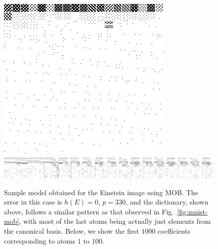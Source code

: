 \documentclass[twocolumn]{IEEEtran}
\theoremstyle{definition}
\begin{document}
\begin{figure}[tp]
\includegraphics[width=0.9\columnwidth]{fig/einstein_mob_dict.png} %
\includegraphics[width=0.9\columnwidth]{fig/einstein_mob_coef_crop.png}
\caption{\label{fig:einstein-mob} Sample model obtained for the Einstein image using MOB. The error in this case is $h(E)=0$, $p=330$, and the dictionary, shown above, follows a similar pattern as that observed in Fig.~\ref{fig:mnist-mob},
 with most of the last atoms being actually just elements from the canonical basis. Below, we show the first $1000$ coefficients corresponding to atoms $1$ to $100$. }
\end{figure}
%
%
\end{document}

